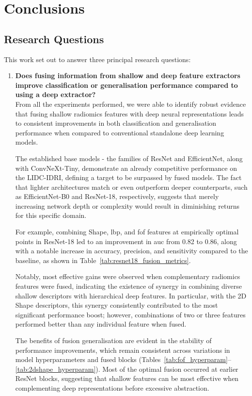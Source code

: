 \chapter{Conclusions}\label{chap:conclusions}

\section{Research Questions}


This work set out to answer three principal research questions:

\begin{enumerate}
  \item \textbf{Does fusing information from shallow and deep feature extractors improve classification or generalisation performance compared to using a deep extractor?}\\
From all the experiments performed, we were able to identify robust evidence that fusing shallow radiomics features with deep neural representations leads to consistent improvements in both classification and generalisation performance when compared to conventional standalone deep learning models.

The established base models - the families of ResNet and EfficientNet, along with ConvNeXt-Tiny, demonstrate an already competitive performance on the LIDC-IDRI, defining a target to be surpassed by fused models. The fact that lighter architectures match or even outperform deeper counterparts, such as EfficientNet-B0 and ResNet-18, respectively, suggests that merely increasing network depth or complexity would result in diminishing returns for this specific domain.

For example, combining Shape, \ac{lbp}, and \ac{fof} features at empirically optimal points in ResNet-18 led to an improvement in \ac{auc} from 0.82 to 0.86, along with a notable increase in accuracy, precision, and sensitivity compared to the baseline, as shown in Table~\ref{tab:resnet18_fusion_metrics}.

Notably, most effective gains were observed when complementary radiomics features were fused, indicating the existence of synergy in combining diverse shallow descriptors with hierarchical deep features. In particular, with the 2D Shape descriptors, this synergy consistently contributed to the most significant performance boost; however, combinations of two or three features performed better than any individual feature when fused.

The benefits of fusion generalisation are evident in the stability of performance improvements, which remain consistent across variations in model hyperparameters and fused blocks (Tables~\ref{tab:fof_hyperparam}--\ref{tab:2dshape_hyperparam}).
Most of the optimal fusion occurred at earlier ResNet blocks, suggesting that shallow features can be most effective when complementing deep representations before excessive abstraction. 


\end{enumerate}
